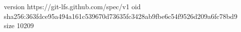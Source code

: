 version https://git-lfs.github.com/spec/v1
oid sha256:363fdce95a494a161c539670d73635fc3428ab9fbe6c54f9526d209a6fc78bd9
size 10209
